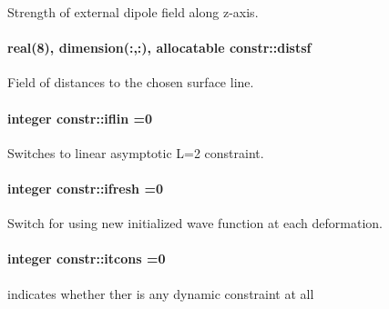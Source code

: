Strength of external dipole field along z-\/axis. 

\paragraph[{\texorpdfstring{distsf}{distsf}}]{\setlength{\rightskip}{0pt plus 5cm}real(8), dimension(\+:,\+:), allocatable constr\+::distsf}\hypertarget{namespaceconstr_a2aa658d9e448900c74a484233c9c3e65}{}\label{namespaceconstr_a2aa658d9e448900c74a484233c9c3e65}


Field of distances to the chosen surface line. 

\paragraph[{\texorpdfstring{iflin}{iflin}}]{\setlength{\rightskip}{0pt plus 5cm}integer constr\+::iflin =0}\hypertarget{namespaceconstr_ab2fbc57b03ef687dc320a927da5e22a3}{}\label{namespaceconstr_ab2fbc57b03ef687dc320a927da5e22a3}


Switches to linear asymptotic L=2 constraint. 

\paragraph[{\texorpdfstring{ifresh}{ifresh}}]{\setlength{\rightskip}{0pt plus 5cm}integer constr\+::ifresh =0}\hypertarget{namespaceconstr_abc7bfde5d5d47ed18ddc164508cfa1ac}{}\label{namespaceconstr_abc7bfde5d5d47ed18ddc164508cfa1ac}


Switch for using new initialized wave function at each deformation. 

\paragraph[{\texorpdfstring{itcons}{itcons}}]{\setlength{\rightskip}{0pt plus 5cm}integer constr\+::itcons =0}\hypertarget{namespaceconstr_a1c14adff3a21fe2b7dd3805ca890a711}{}\label{namespaceconstr_a1c14adff3a21fe2b7dd3805ca890a711}


indicates whether ther is any dynamic constraint at all 

